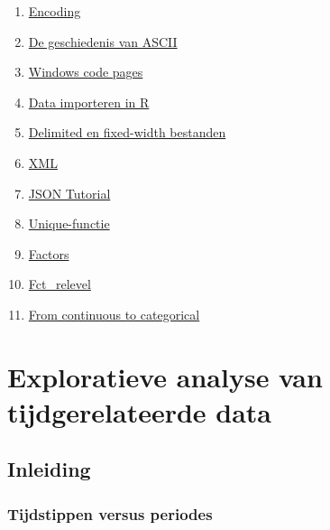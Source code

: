 \documentclass[]{memoir}
\providecommand{\tightlist}{%
  \setlength{\itemsep}{0pt}\setlength{\parskip}{0pt}}
\begin{document}
\begin{enumerate}
\def\labelenumi{\arabic{enumi}.}
\tightlist
\item
  \href{http://kunststube.net/encoding/}{Encoding}
\item
  \href{https://www.joelonsoftware.com/2003/10/08/the-absolute-minimum-every-software-developer-absolutely-positively-must-know-about-unicode-and-character-sets-no-excuses/}{De geschiedenis van ASCII}
\item
  \href{https://en.wikipedia.org/wiki/Windows_code_page}{Windows code pages}
\item
  \href{http://r4ds.had.co.nz/data-import.html}{Data importeren in R}
\item
  \href{https://www.techwalla.com/articles/what-is-a-delimited-a-fixed-width-file}{Delimited en fixed-width bestanden}
\item
  \href{https://www.w3schools.com/xml/default.asp}{XML}
\item
  \href{http://beginnersbook.com/2015/04/json-tutorial/}{JSON Tutorial}
\item
  \href{https://chemicalstatistician.wordpress.com/2018/03/10/use-unique-instead-of-levels-to-find-the-possible-values-of-a-character-variable-in-r/}{Unique-functie}
\item
  \href{http://r4ds.had.co.nz/factors.html}{Factors}
\item
  \href{http://forcats.tidyverse.org/reference/fct_relevel.html}{Fct\_relevel}
\item
  \href{http://rforpublichealth.blogspot.be/2012/09/from-continuous-to-categorical.html}{From continuous to categorical}
\end{enumerate}

\hypertarget{exploratieve-analyse-van-tijdgerelateerde-data}{%
\chapter{Exploratieve analyse van tijdgerelateerde data}\label{exploratieve-analyse-van-tijdgerelateerde-data}}

\hypertarget{inleiding}{%
\section{Inleiding}\label{inleiding}}

\hypertarget{tijdstippen-versus-periodes}{%
\subsection{Tijdstippen versus periodes}\label{tijdstippen-versus-periodes}}
\end{document}
